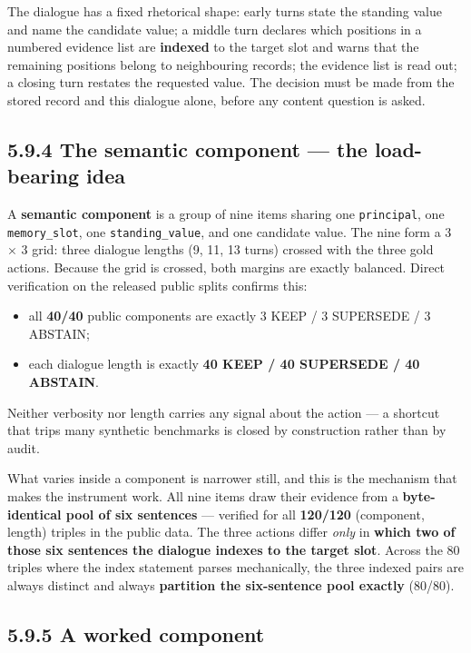 The dialogue has a fixed rhetorical shape: early turns state the
standing value and name the candidate value; a middle turn declares
which positions in a numbered evidence list are \textbf{indexed} to the
target slot and warns that the remaining positions belong to
neighbouring records; the evidence list is read out; a closing turn
restates the requested value. The decision must be made from the stored
record and this dialogue alone, before any content question is asked.

\subsection{5.9.4 The semantic component --- the load-bearing
idea}\label{the-semantic-component-the-load-bearing-idea}

A \textbf{semantic component} is a group of nine items sharing one
\texttt{principal}, one \texttt{memory\_slot}, one
\texttt{standing\_value}, and one candidate value. The nine form a 3 × 3
grid: three dialogue lengths (9, 11, 13 turns) crossed with the three
gold actions. Because the grid is crossed, both margins are exactly
balanced. Direct verification on the released public splits confirms
this:

\begin{itemize}
\tightlist
\item
  all \textbf{40/40} public components are exactly 3 KEEP / 3 SUPERSEDE
  / 3 ABSTAIN;
\item
  each dialogue length is exactly \textbf{40 KEEP / 40 SUPERSEDE / 40
  ABSTAIN}.
\end{itemize}

Neither verbosity nor length carries any signal about the action --- a
shortcut that trips many synthetic benchmarks is closed by construction
rather than by audit.

What varies inside a component is narrower still, and this is the
mechanism that makes the instrument work. All nine items draw their
evidence from a \textbf{byte-identical pool of six sentences} ---
verified for all \textbf{120/120} (component, length) triples in the
public data. The three actions differ \emph{only} in \textbf{which two
of those six sentences the dialogue indexes to the target slot}. Across
the 80 triples where the index statement parses mechanically, the three
indexed pairs are always distinct and always \textbf{partition the
six-sentence pool exactly} (80/80).

\subsection{5.9.5 A worked component}\label{a-worked-component}

